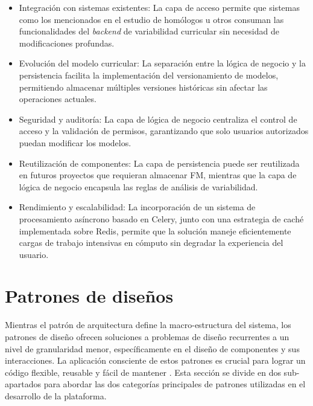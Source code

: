 \begin{itemize}
    \item Integración con sistemas existentes: La capa de acceso permite que sistemas como los mencionados 
	en el estudio de homólogos u otros consuman las funcionalidades del \textit{backend} de variabilidad 
	curricular sin necesidad de modificaciones profundas.
    
    \item Evolución del modelo curricular: La separación entre la lógica de negocio y la persistencia facilita la 
	implementación del versionamiento de modelos, permitiendo almacenar múltiples versiones históricas sin afectar las 
	operaciones actuales.
    
    \item Seguridad y auditoría: La capa de lógica de negocio centraliza el control de acceso y la validación 
	de permisos, garantizando que solo usuarios autorizados puedan modificar los modelos.
    
    \item Reutilización de componentes: La capa de persistencia puede ser reutilizada en futuros proyectos 
	que requieran almacenar \ac{FM}, mientras que la capa de lógica de negocio encapsula las reglas de 
	análisis de variabilidad.
	
	\item Rendimiento y escalabilidad: La incorporación de un sistema de procesamiento asíncrono basado en Celery, junto con una estrategia de caché 
	implementada sobre Redis, permite que la solución maneje eficientemente cargas de trabajo intensivas en cómputo sin degradar 
	la experiencia del usuario.
\end{itemize}

\section{Patrones de diseños}

Mientras el patrón de arquitectura define la macro-estructura del sistema, los patrones de diseño ofrecen
soluciones a problemas de diseño recurrentes a un nivel de granularidad menor, específicamente en el diseño
de componentes y sus interacciones. La aplicación consciente de estos patrones es crucial para lograr un
código flexible, reusable y fácil de mantener \citep{aratchige2024overview}. Esta sección se
divide en dos sub-apartados para abordar las dos categorías principales de patrones utilizadas en el desarrollo
de la plataforma.

